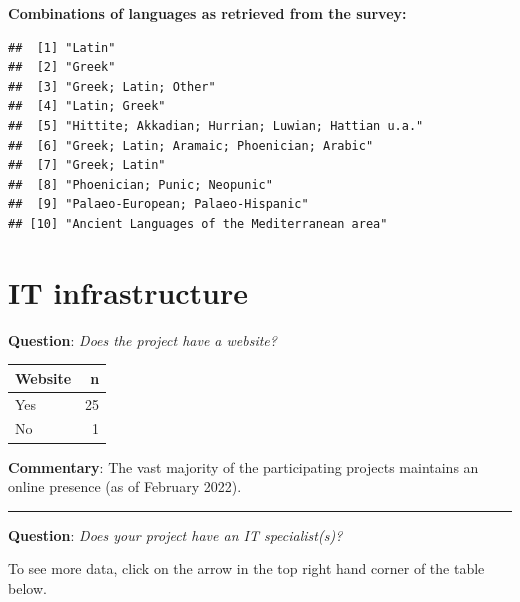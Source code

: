 \documentclass[
  12pt,
]{scrreprt}
\begin{document}
\textbf{Combinations of languages as retrieved from the survey:}

\begin{verbatim}
##  [1] "Latin"                                           
##  [2] "Greek"                                           
##  [3] "Greek; Latin; Other"                             
##  [4] "Latin; Greek"                                    
##  [5] "Hittite; Akkadian; Hurrian; Luwian; Hattian u.a."
##  [6] "Greek; Latin; Aramaic; Phoenician; Arabic"       
##  [7] "Greek; Latin"                                    
##  [8] "Phoenician; Punic; Neopunic"                     
##  [9] "Palaeo-European; Palaeo-Hispanic"                
## [10] "Ancient Languages of the Mediterranean area"
\end{verbatim}

\hypertarget{it-infrastructure-1}{%
\section{IT infrastructure}\label{it-infrastructure-1}}

\textbf{Question}: \emph{Does the project have a website?}

\begin{longtable}[]{@{}lr@{}}
\toprule
Website & n \\
\midrule
\endhead
Yes & 25 \\
No & 1 \\
\bottomrule
\end{longtable}

\textbf{Commentary}: The vast majority of the participating projects
maintains an online presence (as of February 2022).

\begin{center}\rule{0.5\linewidth}{0.5pt}\end{center}

\textbf{Question}: \emph{Does your project have an IT specialist(s)?}

To see more data, click on the arrow in the top right hand corner of the
table below.
\end{document}
